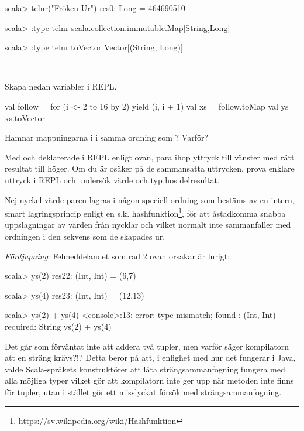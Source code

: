 \begin{REPL}
scala> telnr("Fröken Ur")
res0: Long = 464690510

scala> :type telnr
scala.collection.immutable.Map[String,Long]

scala> :type telnr.toVector
Vector[(String, Long)]
\end{REPL}

\QUESTEND




\QUESTBEGIN

\Task \what~

\Subtask Skapa nedan variabler i REPL.
\begin{Code}
val follow = for (i <- 2 to 16 by 2) yield (i, i + 1)
val xs = follow.toMap
val ys = xs.toVector
\end{Code}
Hamnar mappningarna i  i samma ordning som ? Varför?

\Subtask Med  och  deklarerade i REPL enligt ovan, para ihop yttryck till vänster med rätt resultat till höger. Om du är osäker på de sammansatta uttrycken, prova enklare uttryck i REPL och undersök värde och typ hos delresultat.

\begin{ConceptConnections}

\end{ConceptConnections}

\SOLUTION

\TaskSolved \what


\SubtaskSolved Nej nyckel-värde-paren lagras i någon speciell ordning som bestäms av en intern, smart lagringsprincip enligt en s.k. hashfunktion\footnote{\url{https://sv.wikipedia.org/wiki/Hashfunktion}}, för att åstadkomma snabba uppslagningar av värden från nycklar och vilket normalt inte sammanfaller med ordningen i den sekvens som de skapades ur.

\SubtaskSolved

\begin{ConceptConnections}
  
\end{ConceptConnections}

\noindent \emph{Fördjupning}:  Felmeddelandet som rad 2 ovan orsakar är lurigt:

\begin{REPL}
scala> ys(2)
res22: (Int, Int) = (6,7)

scala> ys(4)
res23: (Int, Int) = (12,13)

scala> ys(2) + ys(4)
<console>:13: error: type mismatch;
 found   : (Int, Int)
 required: String
       ys(2) + ys(4)

\end{REPL}
Det går som förväntat inte att addera två tupler, men varför säger kompilatorn att en sträng krävs?!? Detta beror på att, i enlighet med hur det fungerar i Java, valde Scala-språkets konstruktörer att låta strängsammanfogning fungera med alla möjliga typer vilket gör att kompilatorn inte ger upp när metoden \code{+} inte finns för tupler, utan i stället gör ett misslyckat försök med strängsammanfogning.

